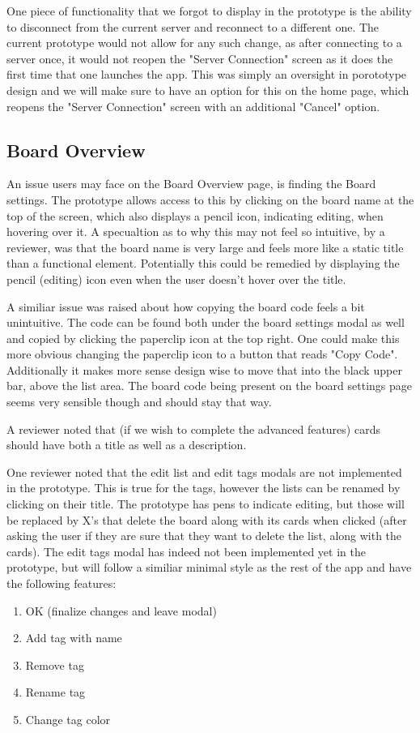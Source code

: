    One piece of functionality that we forgot to display in the prototype is the ability to disconnect from the current server and reconnect to a different one. The current prototype would not allow for any such change, as after connecting to a server once, it would not reopen the "Server Connection" screen as it does the first time that one launches the app. This was simply an oversight in porototype design and we will make sure to have an option for this on the home page, which reopens the "Server Connection" screen with an additional "Cancel" option.

\subsection{Board Overview}

    An issue users may  face on the Board Overview page, is finding the Board settings. The prototype allows access to this by clicking on the board name at the top of the screen, which also displays a pencil icon, indicating editing, when hovering over it. A specualtion as to why this may not feel so intuitive, by a reviewer, was that the board name is very large and feels more like a static title than a functional element. Potentially this could be remedied by displaying the pencil (editing) icon even when the user doesn't hover over the title. 

    A similiar issue was raised about how copying the board code feels a bit unintuitive. The code can be found both under the board settings modal as well and copied by clicking the paperclip icon at the top right. One could make this more obvious changing the paperclip icon to a button that reads "Copy Code". Additionally it makes more sense design wise to move that into the black upper bar, above the list area. The board code being present on the board settings page seems very sensible though and should stay that way.

    A reviewer noted that (if we wish to complete the advanced features) cards should have both a title as well as a description.

    One reviewer noted that the edit list and edit tags modals are not implemented in the prototype. This is true for the tags, however the lists can be renamed by clicking on their title. The prototype has pens to indicate editing, but those will be replaced by X's that delete the board along with its cards when clicked (after asking the user if they are sure that they want to delete the list, along with the cards). The edit tags modal has indeed not been implemented yet in the prototype, but will follow a similiar minimal style as the rest of the app and have the following features:
\begin{enumerate}
    \item OK (finalize changes and leave modal)
    \item Add tag with name
    \item Remove tag
    \item Rename tag
    \item Change tag color
\end{enumerate}

